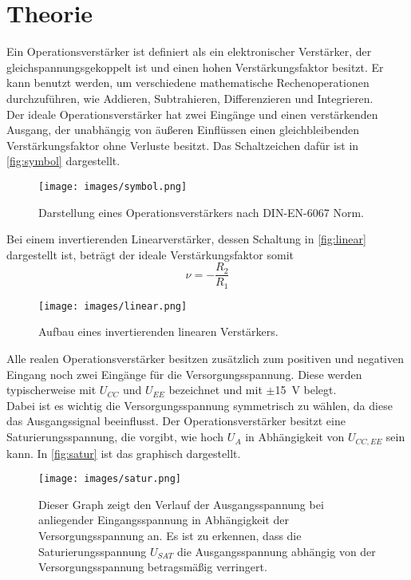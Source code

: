 \section{Theorie}
\label{sec:theorie}

Ein Operationsverstärker ist definiert als ein elektronischer Verstärker, der gleichspannungsgekoppelt ist und einen hohen Verstärkungsfaktor besitzt.
Er kann benutzt werden, um verschiedene mathematische Rechenoperationen durchzuführen, wie Addieren, Subtrahieren, Differenzieren und Integrieren.\\
Der ideale Operationsverstärker hat zwei Eingänge und einen verstärkenden Ausgang, der unabhängig von äußeren Einflüssen einen gleichbleibenden Verstärkungsfaktor ohne Verluste besitzt.
Das Schaltzeichen dafür ist in \autoref{fig:symbol} dargestellt.

\begin{figure}[H]
    \centering
    \texttt{[image: images/symbol.png]}
    \caption{Darstellung eines Operationsverstärkers nach DIN-EN-6067 Norm.\cite{V51}}
    \label{fig:symbol}
\end{figure}

Bei einem invertierenden Linearverstärker, dessen Schaltung in \autoref{fig:linear} dargestellt ist, beträgt der ideale Verstärkungsfaktor somit
\begin{equation}
    \nu = -\frac{R_2}{R_1}
\end{equation}

\begin{figure}[H]
    \centering
    \texttt{[image: images/linear.png]}
    \caption{Aufbau eines invertierenden linearen Verstärkers.\cite{V51}}
    \label{fig:linear}
\end{figure}

Alle realen Operationsverstärker besitzen zusätzlich zum positiven und negativen Eingang noch zwei Eingänge für die Versorgungsspannung.
Diese werden typischerweise mit $U_{CC}$ und $U_{EE}$ bezeichnet und mit $\pm$\SI{15}{\volt} belegt.\\
Dabei ist es wichtig die Versorgungsspannung symmetrisch zu wählen, da diese das Ausgangssignal beeinflusst.
Der Operationsverstärker besitzt eine Saturierungsspannung, die vorgibt, wie hoch $U_A$ in Abhängigkeit von $U_{CC,EE}$ sein kann.
In \autoref{fig:satur} ist das graphisch dargestellt.

\begin{figure}[H]
    \centering
    \texttt{[image: images/satur.png]}
    \caption{Dieser Graph zeigt den Verlauf der Ausgangsspannung bei anliegender Eingangsspannung in Abhängigkeit der Versorgungsspannung an.
    Es ist zu erkennen, dass die Saturierungsspannung $U_{SAT}$ die Ausgangsspannung abhängig von der Versorgungsspannung betragsmäßig verringert.\cite{satur}}
    \label{fig:satur}
\end{figure}

